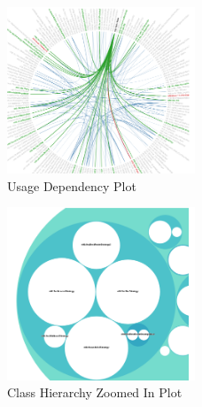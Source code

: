 \documentclass{sig-alternate}
\begin{document}
\begin{figure}
\centering
\includegraphics[width=0.5\textwidth]{usage-dependency.png}
\caption{Usage Dependency Plot}
\label{fig:usagedependency}
\end{figure}

\begin{figure}
\centering
\includegraphics[width=0.5\textwidth]{class-hierachy-zoomed-in.png}
\caption{Class Hierarchy Zoomed In Plot}
\label{fig:class-hierachy-zoomed-in}
\end{figure}
\end{document}
